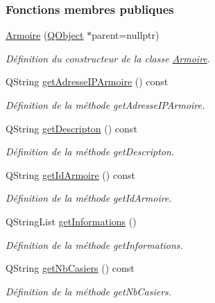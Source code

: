 \subsubsection*{Fonctions membres publiques}
\begin{DoxyCompactItemize}
\item 
\hyperlink{class_armoire_a5db260c682a9d2688afc0efbd5be8d14}{Armoire} (\hyperlink{class_q_object}{Q\+Object} $\ast$parent=nullptr)
\begin{DoxyCompactList}\small\item\em Définition du constructeur de la classe \hyperlink{class_armoire}{Armoire}. \end{DoxyCompactList}\item 
Q\+String \hyperlink{class_armoire_a706def736570580d7e5e3d2e29321c66}{get\+Adresse\+I\+P\+Armoire} () const
\begin{DoxyCompactList}\small\item\em Définition de la méthode get\+Adresse\+I\+P\+Armoire. \end{DoxyCompactList}\item 
Q\+String \hyperlink{class_armoire_a19af26aa7dedd03202d2484744dcad76}{get\+Descripton} () const
\begin{DoxyCompactList}\small\item\em Définition de la méthode get\+Descripton. \end{DoxyCompactList}\item 
Q\+String \hyperlink{class_armoire_a1a76e497170632b30f9821b396d53cec}{get\+Id\+Armoire} () const
\begin{DoxyCompactList}\small\item\em Définition de la méthode get\+Id\+Armoire. \end{DoxyCompactList}\item 
Q\+String\+List \hyperlink{class_armoire_a3e4d2ffc2fb91dd24d1160305ad36555}{get\+Informations} ()
\begin{DoxyCompactList}\small\item\em Définition de la méthode get\+Informations. \end{DoxyCompactList}\item 
Q\+String \hyperlink{class_armoire_aa94faaf53b6da5139a22a2ab21d4cf12}{get\+Nb\+Casiers} () const
\begin{DoxyCompactList}\small\item\em Définition de la méthode get\+Nb\+Casiers. \end{DoxyCompactList}\item 

\end{DoxyCompactItemize}
